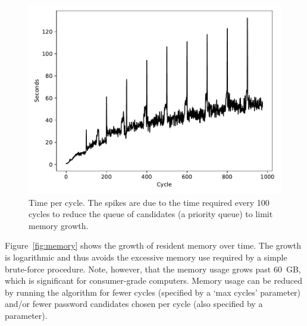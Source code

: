 \documentclass[letterpaper,twocolumn,10pt]{article}
\begin{document}
\begin{figure}[h]
\includegraphics[width=\linewidth]
{analysis/passwords-analysis/stats-seconds.pdf}
\caption{Time per cycle. The spikes are due to the time required every 100
cycles to reduce the queue of candidates (a priority queue) to limit memory
growth.}
\label{fig:seconds}
\end{figure}

Figure~\ref{fig:memory} shows the growth of resident memory over time. The
growth is logarithmic and thus avoids the excessive memory use required by a
simple brute-force procedure. Note, however, that the memory usage grows past
60~GB, which is significant for consumer-grade computers. Memory usage can be
reduced by running the algorithm for fewer cycles (specified by a `max cycles'
parameter) and/or fewer password candidates chosen per cycle (also specified by
a parameter).
\end{document}
